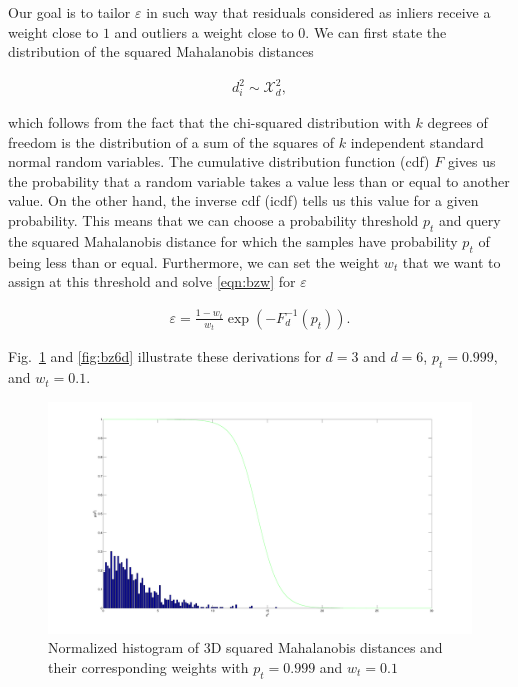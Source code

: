 \documentclass[12pt]{article}
\begin{document}
      Our goal is to tailor $\varepsilon$ in such way that residuals considered
      as inliers receive a weight close to $1$ and outliers a weight close to
      $0$. We can first state the distribution of the squared Mahalanobis
      distances

      \begin{equation}\label{eqn:mddist}
        \begin{aligned}
          d_i^2 \sim \mathcal{X}^2_d,
        \end{aligned}
      \end{equation}

      \noindent which follows from the fact that the chi-squared distribution
      with $k$ degrees of freedom is the distribution of a sum of the squares of
      $k$ independent standard normal random variables. The cumulative
      distribution function (cdf) $F$ gives us the probability that a random
      variable takes a value less than or equal to another value. On the other
      hand, the inverse cdf (icdf) tells us this value for a given probability.
      This means that we can choose a probability threshold $p_t$ and query the
      squared Mahalanobis distance for which the samples have probability $p_t$
      of being less than or equal. Furthermore, we can set the weight $w_t$ that
      we want to assign at this threshold and solve \eqref{eqn:bzw} for
      $\varepsilon$

      \begin{equation}\label{eqn:epsilon}
        \begin{aligned}
          \varepsilon = \frac{1 - w_t}{w_t}\exp(-F^{-1}_d(p_t)).
        \end{aligned}
      \end{equation}

      Fig.~\ref{fig:bz3d} and \ref{fig:bz6d} illustrate these derivations for
      $d=3$ and $d=6$, $p_t=0.999$, and $w_t=0.1$.

      \begin{figure}[t]
        \centering
        \includegraphics[scale = 0.3]{bz3d}
        \caption{Normalized histogram of 3D squared Mahalanobis distances and
          their corresponding weights with $p_t=0.999$ and $w_t=0.1$}
        \label{fig:bz3d}
      \end{figure}
\end{document}
